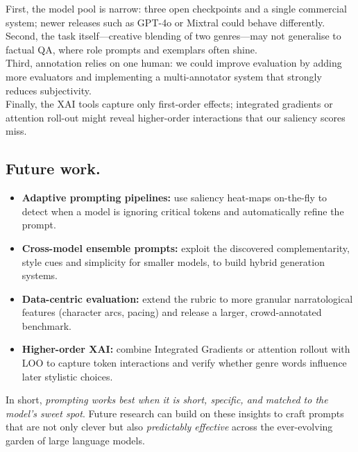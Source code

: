 \documentclass[12pt]{article}
\begin{document}
First, the model pool is narrow: three open checkpoints and a single
commercial system; newer releases such as GPT-4o or Mixtral could
behave differently.  \\

Second, the task itself—creative blending of two genres—may not
generalise to factual QA, where role prompts and exemplars often shine. \\

Third, annotation relies on one human: we could improve evaluation by adding more evaluators and implementing a multi-annotator system that strongly reduces subjectivity. \\

Finally, the XAI tools capture only first-order effects; integrated
gradients or attention roll-out might reveal higher-order interactions
that our saliency scores miss.

\subsection{Future work.}

\begin{itemize}
  \item \textbf{Adaptive prompting pipelines:} use saliency heat-maps
        on-the-fly to detect when a model is ignoring critical tokens
        and automatically refine the prompt.
  \item \textbf{Cross-model ensemble prompts:} exploit the discovered
        complementarity, style cues and simplicity for
        smaller models, to build hybrid generation systems.
  \item \textbf{Data-centric evaluation:} extend the rubric to more
        granular narratological features (character arcs, pacing) and
        release a larger, crowd-annotated benchmark.
  \item \textbf{Higher-order XAI:} combine Integrated Gradients or
        attention rollout with LOO to capture token interactions and
        verify whether genre words influence later stylistic choices.
\end{itemize}

\vspace{1em}
\noindent
In short, \textit{prompting works best when it is short, specific,
and matched to the model’s sweet spot}.  Future research can build on
these insights to craft prompts that are not only clever but also
\emph{predictably effective} across the ever-evolving garden of large language models.
\end{document}
